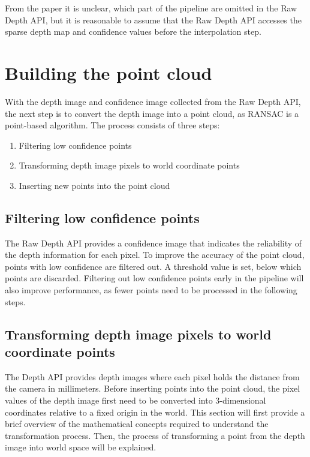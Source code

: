 From the paper it is unclear, which part of the pipeline are omitted in the Raw Depth API,
but it is reasonable to assume that the Raw Depth API accesses the sparse depth map and confidence values before the interpolation step.


\section{Building the point cloud}
With the depth image and confidence image collected from the Raw Depth API,
the next step is to convert the depth image into a point cloud, as RANSAC is a point-based algorithm.
The process consists of three steps:
\begin{enumerate}
    \item Filtering low confidence points
    \item Transforming depth image pixels to world coordinate points
    \item Inserting new points into the point cloud
\end{enumerate}

\subsection{Filtering low confidence points}
The Raw Depth API provides a confidence image that indicates the reliability of the depth information for each pixel.
To improve the accuracy of the point cloud, points with low confidence are filtered out.
A threshold value is set, below which points are discarded.
Filtering out low confidence points early in the pipeline will also improve performance,
as fewer points need to be processed in the following steps.

\subsection{Transforming depth image pixels to world coordinate points}
The Depth API provides depth images where each pixel holds the distance
from the camera in millimeters.
Before inserting points into the point cloud, the pixel values of the depth image
first need to be converted into 3-dimensional coordinates relative to a fixed origin in the world.
This section will first provide a brief overview of the mathematical concepts required to understand the transformation process.
Then, the process of transforming a point from the depth image into world space will be explained.


